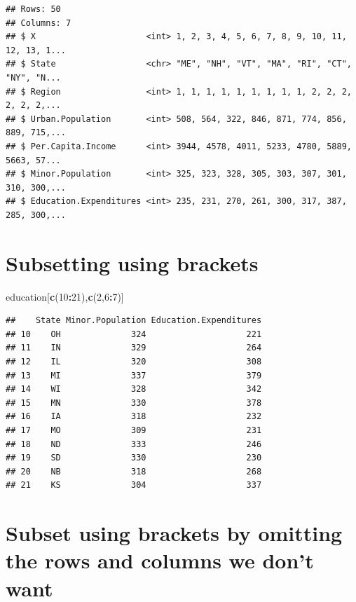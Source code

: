 \documentclass[]{book}
\newenvironment{Shaded}{\begin{snugshade}}{\end{snugshade}}
\newcommand{\DecValTok}[1]{\textcolor[rgb]{0.00,0.00,0.81}{#1}}
\newcommand{\KeywordTok}[1]{\textcolor[rgb]{0.13,0.29,0.53}{\textbf{#1}}}
\newcommand{\NormalTok}[1]{#1}
\newcommand{\OperatorTok}[1]{\textcolor[rgb]{0.81,0.36,0.00}{\textbf{#1}}}
\begin{document}
\begin{verbatim}
## Rows: 50
## Columns: 7
## $ X                      <int> 1, 2, 3, 4, 5, 6, 7, 8, 9, 10, 11, 12, 13, 1...
## $ State                  <chr> "ME", "NH", "VT", "MA", "RI", "CT", "NY", "N...
## $ Region                 <int> 1, 1, 1, 1, 1, 1, 1, 1, 1, 2, 2, 2, 2, 2, 2,...
## $ Urban.Population       <int> 508, 564, 322, 846, 871, 774, 856, 889, 715,...
## $ Per.Capita.Income      <int> 3944, 4578, 4011, 5233, 4780, 5889, 5663, 57...
## $ Minor.Population       <int> 325, 323, 328, 305, 303, 307, 301, 310, 300,...
## $ Education.Expenditures <int> 235, 231, 270, 261, 300, 317, 387, 285, 300,...
\end{verbatim}

\hypertarget{subsetting-using-brackets}{%
\section{Subsetting using brackets}\label{subsetting-using-brackets}}

\begin{Shaded}
\begin{Highlighting}[]
\NormalTok{education[}\KeywordTok{c}\NormalTok{(}\DecValTok{10}\OperatorTok{:}\DecValTok{21}\NormalTok{),}\KeywordTok{c}\NormalTok{(}\DecValTok{2}\NormalTok{,}\DecValTok{6}\OperatorTok{:}\DecValTok{7}\NormalTok{)]}
\end{Highlighting}
\end{Shaded}

\begin{verbatim}
##    State Minor.Population Education.Expenditures
## 10    OH              324                    221
## 11    IN              329                    264
## 12    IL              320                    308
## 13    MI              337                    379
## 14    WI              328                    342
## 15    MN              330                    378
## 16    IA              318                    232
## 17    MO              309                    231
## 18    ND              333                    246
## 19    SD              330                    230
## 20    NB              318                    268
## 21    KS              304                    337
\end{verbatim}

\hypertarget{subset-using-brackets-by-omitting-the-rows-and-columns-we-dont-want}{%
\section{Subset using brackets by omitting the rows and columns we don't want}\label{subset-using-brackets-by-omitting-the-rows-and-columns-we-dont-want}}
\end{document}
